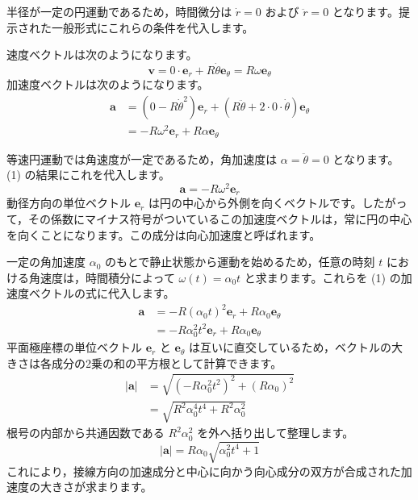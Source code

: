 \solutionheading
\begin{solutionparts}

半径が一定の円運動であるため，時間微分は $\dot{r} = 0$ および $\ddot{r} = 0$ となります。提示された一般形式にこれらの条件を代入します。
\par
速度ベクトルは次のようになります。
\begin{equation*}
\boldsymbol{v} = 0 \cdot \boldsymbol{e}_r + R \dot{\theta} \boldsymbol{e}_\theta = R \omega \boldsymbol{e}_\theta
\end{equation*}
加速度ベクトルは次のようになります。
\begin{align*}
\boldsymbol{a}
  &= (0-R\dot{\theta}^2)\boldsymbol{e}_r
   +(R\ddot{\theta}+2\cdot0\cdot\dot{\theta})\boldsymbol{e}_\theta \\
  &= -R\omega^2\boldsymbol{e}_r+R\alpha\boldsymbol{e}_\theta
\end{align*}

等速円運動では角速度が一定であるため，角加速度は $\alpha = \ddot{\theta} = 0$ となります。(1) の結果にこれを代入します。
\begin{equation*}
\boldsymbol{a} = -R \omega^2 \boldsymbol{e}_r
\end{equation*}
動径方向の単位ベクトル $\boldsymbol{e}_r$ は円の中心から外側を向くベクトルです。したがって，その係数にマイナス符号がついているこの加速度ベクトルは，常に円の中心を向くことになります。この成分は向心加速度と呼ばれます。

一定の角加速度 $\alpha_0$ のもとで静止状態から運動を始めるため，任意の時刻 $t$ における角速度は，時間積分によって $\omega(t) = \alpha_0 t$ と求まります。これらを (1) の加速度ベクトルの式に代入します。
\begin{align*}
\boldsymbol{a}
  &= -R(\alpha_0t)^2\boldsymbol{e}_r
   +R\alpha_0\boldsymbol{e}_\theta \\
  &= -R\alpha_0^2t^2\boldsymbol{e}_r
   +R\alpha_0\boldsymbol{e}_\theta
\end{align*}
平面極座標の単位ベクトル $\boldsymbol{e}_r$ と $\boldsymbol{e}_\theta$ は互いに直交しているため，ベクトルの大きさは各成分の2乗の和の平方根として計算できます。
\begin{align*}
|\boldsymbol{a}|
  &= \sqrt{(-R\alpha_0^2t^2)^2+(R\alpha_0)^2} \\
  &= \sqrt{R^2\alpha_0^4t^4+R^2\alpha_0^2}
\end{align*}
根号の内部から共通因数である $R^2 \alpha_0^2$ を外へ括り出して整理します。
\begin{equation*}
|\boldsymbol{a}| = R \alpha_0 \sqrt{\alpha_0^2 t^4 + 1}
\end{equation*}
これにより，接線方向の加速成分と中心に向かう向心成分の双方が合成された加速度の大きさが求まります。

\end{solutionparts}
